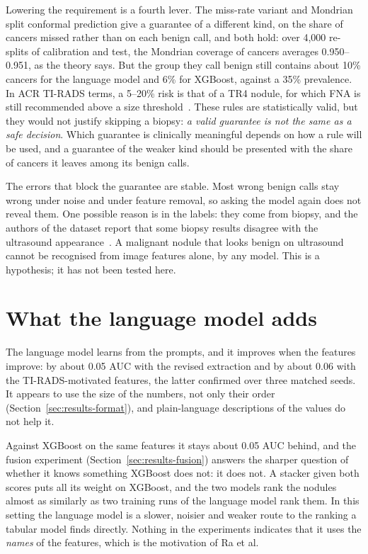 Lowering the requirement is a fourth lever. The miss-rate variant and Mondrian split conformal
prediction give a guarantee of a different kind, on the share of cancers missed rather than on
each benign call, and both hold: over 4,000 re-splits of calibration and test, the Mondrian
coverage of cancers averages 0.950--0.951, as the theory says. But the group they call benign
still contains about 10\% cancers for the language model and 6\% for XGBoost, against a 35\%
prevalence. In ACR TI-RADS terms, a 5--20\% risk is that of a TR4 nodule, for which FNA is still
recommended above a size threshold~\citep{tessler2017}. These rules are statistically valid, but
they would not justify skipping a biopsy: \emph{a valid guarantee is not the same as a safe
decision}. Which guarantee is clinically meaningful depends on how a rule will be used, and a
guarantee of the weaker kind should be presented with the share of cancers it leaves among its
benign calls.

The errors that block the guarantee are stable. Most wrong benign calls stay wrong under noise
and under feature removal, so asking the model again does not reveal them. One possible reason is
in the labels: they come from biopsy, and the authors of the dataset report that some biopsy
results disagree with the ultrasound appearance~\citep{gong2022acl}. A malignant nodule that looks
benign on ultrasound cannot be recognised from image features alone, by any model. This is a
hypothesis; it has not been tested here.

\section{What the language model adds}
\label{sec:disc-llm}

The language model learns from the prompts, and it improves when the features improve: by about
0.05 AUC with the revised extraction and by about 0.06 with the TI-RADS-motivated features, the
latter confirmed over three matched seeds. It appears to use the size of the numbers, not only
their order (Section~\ref{sec:results-format}), and plain-language descriptions of the values do
not help it.

Against XGBoost on the same features it stays about 0.05 AUC behind, and the fusion experiment
(Section~\ref{sec:results-fusion}) answers the sharper question of whether it knows something
XGBoost does not: it does not. A stacker given both scores puts all its weight on XGBoost, and the
two models rank the nodules almost as similarly as two training runs of the language model rank
them. In this setting the language model is a slower, noisier and weaker route to the ranking a
tabular model finds directly. Nothing in the experiments indicates that it uses the
\emph{names} of the features, which is the motivation of Ra et al.

